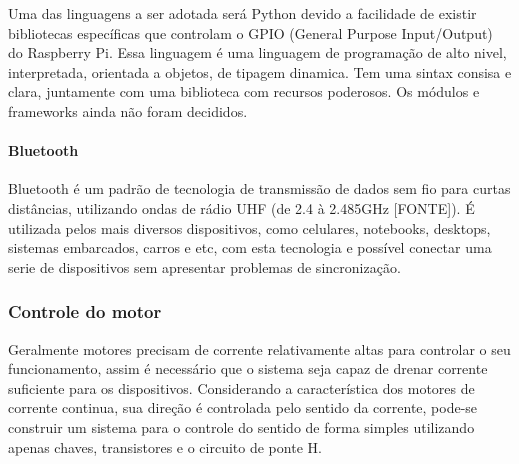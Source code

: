   Uma das linguagens a ser adotada será Python devido a facilidade de existir bibliotecas específicas que controlam o GPIO (General Purpose Input/Output) do Raspberry Pi.
  Essa linguagem é uma linguagem de programação de alto nivel, interpretada, orientada a objetos, de tipagem dinamica. Tem uma sintax consisa e clara, juntamente com uma biblioteca com recursos poderosos. Os módulos e frameworks ainda não foram decididos.

\paragraph{Bluetooth}
  Bluetooth é um padrão de tecnologia de transmissão de dados sem fio para curtas distâncias, utilizando ondas de rádio UHF (de 2.4 à 2.485GHz [FONTE]). É utilizada pelos mais diversos dispositivos, como celulares, notebooks, desktops, sistemas embarcados, carros e etc, com esta tecnologia e possível conectar uma serie de dispositivos sem apresentar problemas de sincronização.

\subsubsection{Controle do motor}

  Geralmente motores precisam de corrente relativamente altas para controlar o seu funcionamento, assim é necessário que o sistema seja capaz de drenar corrente suficiente para os dispositivos. Considerando a característica dos motores de corrente continua, sua direção é controlada pelo sentido da corrente, pode-se construir um sistema para o controle do sentido de forma simples utilizando apenas chaves, transistores e o circuito de ponte H.
